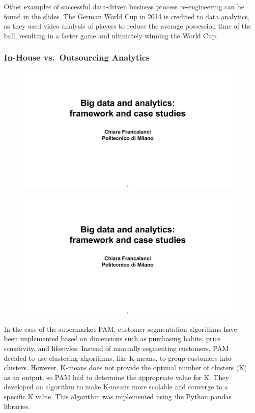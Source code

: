 Other examples of successful data-driven business process re-engineering
can be found in the slides. The German World Cup in 2014 is credited to
data analytics, as they used video analysis of players to reduce the
average possession time of the ball, resulting in a faster game and
ultimately winning the World Cup.

\subsubsection{In-House vs.~Outsourcing Analytics}

\begin{figure}[!h]
    \centering
    \includegraphics[page=71, trim = 1cm 1.5cm 1.5cm 3cm, clip, width=\textwidth]{images/06 - BIG_DATA.pdf}
\end{figure}

\begin{figure}[!h]
    \centering
    \includegraphics[page=72, trim = 3cm 1cm 1.5cm 3cm, clip, width=\textwidth]{images/06 - BIG_DATA.pdf}
\end{figure}

In the case of the supermarket PAM, customer segmentation algorithms
have been implemented based on dimensions such as purchasing habits,
price sensitivity, and lifestyles. Instead of manually segmenting
customers, PAM decided to use clustering algorithms, like K-means, to
group customers into clusters. However, K-means does not provide the
optimal number of clusters (K) as an output, so PAM had to determine the
appropriate value for K. They developed an algorithm to make K-means
more scalable and converge to a specific K value. This algorithm was
implemented using the Python pandas libraries.

